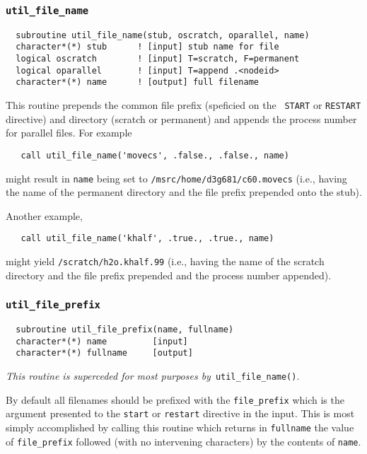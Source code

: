 \subsubsection{{\tt util\_file\_name}}

\begin{verbatim}
  subroutine util_file_name(stub, oscratch, oparallel, name)
  character*(*) stub      ! [input] stub name for file
  logical oscratch        ! [input] T=scratch, F=permanent
  logical oparallel       ! [input] T=append .<nodeid>
  character*(*) name      ! [output] full filename
\end{verbatim}

This routine prepends the common file prefix (speficied on the {\tt
  START} or {\tt RESTART} directive) and directory (scratch or
permanent) and appends the process number for parallel files. For
example
\begin{verbatim}
   call util_file_name('movecs', .false., .false., name)
\end{verbatim}
might result in \verb+name+ being set to
\verb+/msrc/home/d3g681/c60.movecs+ (i.e., having the name of the
permanent directory and the file prefix prepended onto the stub).

Another example,
\begin{verbatim}
   call util_file_name('khalf', .true., .true., name)
\end{verbatim}
might yield \verb+/scratch/h2o.khalf.99+ (i.e., having the name
of the scratch directory and the file prefix prepended and the process
number appended).

\subsubsection{{\tt util\_file\_prefix}}
\begin{verbatim}
  subroutine util_file_prefix(name, fullname)
  character*(*) name         [input]
  character*(*) fullname     [output]
\end{verbatim}
{\em This routine is superceded for most purposes by}\ 
\verb+util_file_name()+.  

By default all filenames should be prefixed
with the \verb+file_prefix+ which is the argument presented to the
\verb+start+ or \verb+restart+ directive in the input.  This is most
simply accomplished by calling this routine which returns in
\verb+fullname+ the value of \verb+file_prefix+ followed (with no
intervening characters) by the contents of \verb+name+.

